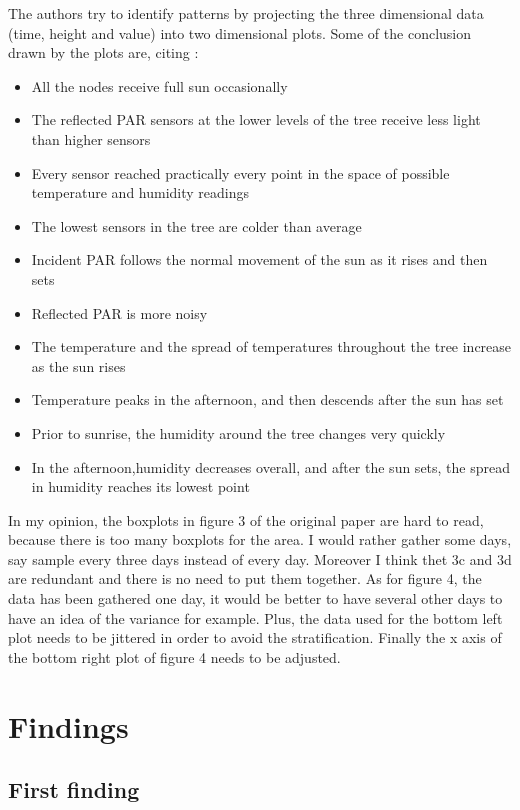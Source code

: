\documentclass[11pt]{article}\usepackage[]{graphicx}\usepackage[]{color}
\begin{document}
The authors try to identify patterns by projecting the three dimensional data (time, height and value) into two dimensional plots. Some of the conclusion drawn by the plots are, citing \cite{tolle2005macroscope}:
\begin{itemize}
\item All the nodes receive full sun occasionally
\item The reflected PAR sensors at the lower levels of the tree receive less light than higher sensors
\item Every sensor reached practically every point in the space of possible temperature and humidity readings
\item The lowest sensors in the tree are colder than average
\item Incident PAR follows the normal movement of the sun as it rises and then sets
\item Reflected PAR is more noisy
\item The temperature and the spread of temperatures throughout the tree increase as the sun rises
\item Temperature peaks in the afternoon, and then descends after the sun has set
\item Prior to sunrise, the humidity around the tree changes very quickly
\item  In the afternoon,humidity decreases overall, and after the sun sets, the spread in humidity reaches its lowest point
\end{itemize}
In my opinion, the boxplots in figure 3 of the original paper are hard to read, because there is too many boxplots for the area. I would rather gather some days, say sample every three days instead of every day. Moreover I think thet 3c and 3d are redundant and there is no need to put them together. As for figure 4, the data has been gathered one day, it would be better to have several other days to have an idea of the variance for example. Plus, the data used for the bottom left plot needs to be jittered in order to avoid the stratification. Finally the x axis of the bottom right plot of figure 4 needs to be adjusted.

\section{Findings}


\subsection{First finding}
\end{document}
